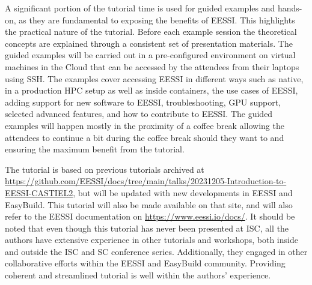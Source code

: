A significant portion of the tutorial time is used for guided examples and hands-on,
as they are fundamental to exposing the benefits of EESSI.
This highlights the practical nature of the tutorial.
Before each example session the theoretical concepts are explained through a consistent set of presentation materials.
The guided examples will be carried out in a pre-configured environment on virtual machines in the Cloud that can be
accessed by the
attendees from their laptops using SSH. 
The examples cover accessing EESSI in different ways such as native, in a production HPC setup as well as inside
containers, the use cases of EESSI, adding support for new software to EESSI, troubleshooting, GPU support, selected
advanced features, and how to contribute to EESSI.
The guided examples will happen mostly in the proximity of a coffee break allowing the attendees to continue
a bit during the coffee break should they want to and ensuring the maximum benefit from the tutorial.

The tutorial is based on previous tutorials archived at \url{https://github.com/EESSI/docs/tree/main/talks/20231205-Introduction-to-EESSI-CASTIEL2},
but will be updated with new developments in EESSI and EasyBuild.
This tutorial will also be made available on that site, and will also refer to the EESSI documentation on
\url{https://www.eessi.io/docs/}.
It should be noted that even though this tutorial has never been presented at ISC, all the authors have extensive
experience in other tutorials and workshops, both inside and outside the ISC and SC conference series. Additionally,
they engaged in other collaborative efforts within the EESSI and EasyBuild community. Providing coherent and streamlined
tutorial is well within the authors' experience.




